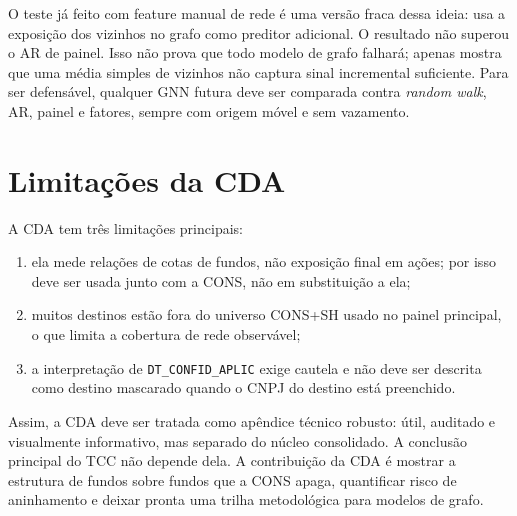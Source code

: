 \documentclass[12pt,a4paper]{report}
\begin{document}
O teste já feito com feature manual de rede é uma versão fraca dessa ideia: usa a exposição dos vizinhos no
grafo como preditor adicional. O resultado não superou o AR de painel. Isso não prova que todo modelo de
grafo falhará; apenas mostra que uma média simples de vizinhos não captura sinal incremental suficiente. Para
ser defensável, qualquer GNN futura deve ser comparada contra \emph{random walk}, AR, painel e fatores,
sempre com origem móvel e sem vazamento.

\section{Limitações da CDA}

A CDA tem três limitações principais:
\begin{enumerate}
\item ela mede relações de cotas de fundos, não exposição final em ações; por isso deve ser usada junto com a
CONS, não em substituição a ela;
\item muitos destinos estão fora do universo CONS+SH usado no painel principal, o que limita a cobertura de
rede observável;
\item a interpretação de \texttt{DT\_CONFID\_APLIC} exige cautela e não deve ser descrita como destino
mascarado quando o CNPJ do destino está preenchido.
\end{enumerate}

Assim, a CDA deve ser tratada como apêndice técnico robusto: útil, auditado e visualmente informativo, mas
separado do núcleo consolidado. A conclusão principal do TCC não depende dela. A contribuição da CDA é
mostrar a estrutura de fundos sobre fundos que a CONS apaga, quantificar risco de aninhamento e deixar pronta
uma trilha metodológica para modelos de grafo.



\end{document}
